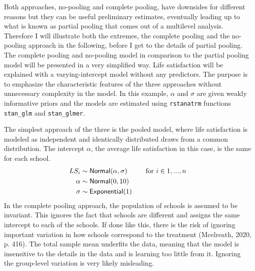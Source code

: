\documentclass[a4, 12pt]{article}
\begin{document}
Both approaches, no-pooling and complete pooling, have downsides for different reasons but they can be useful preliminary estimates, eventually leading up to what is known as partial pooling that comes out of a multilevel analysis. Therefore I will illustrate both the extremes, the complete pooling and the no-pooling approach in the following, before I get to the details of partial pooling. The complete pooling and no-pooling model in comparison to the partial pooling model will be presented in a very simplified way. Life satisfaction will be explained with a varying-intercept model without any predictors. The purpose is to emphasize the characteristic features of the three approaches without unnecessary complexity in the model. In this example, \(\alpha\) and \(\sigma\) are given weakly informative priors and the models are estimated using \texttt{rstanatrm} functions \texttt{stan\_glm} and \texttt{stan\_glmer}.

The simplest approach of the three is the pooled model, where life satisfaction is modeled as independent and identically distributed draws from a common distribution. The intercept \(\alpha\), the average life satisfaction in this case, is the same for each school.
\begin{align*}
LS_i & \sim {\sf {Normal}} (\alpha, \sigma) & \quad \text{for } i \in 1,...,n \\
\alpha & \sim {\sf Normal} (0, 10) \\
\sigma & \sim {\sf Exponential} (1)
\end{align*}
In the complete pooling approach, the population of schools is assumed to be invariant. This ignores the fact that schools are different and assigns the same intercept to each of the schools. If done like this, there is the risk of ignoring important variation in how schools correspond to the treatment (Mcelreath, 2020, p. 416). The total sample mean underfits the data, meaning that the model is insensitive to the details in the data and is learning too little from it. Ignoring the group-level variation is very likely misleading.
\end{document}
